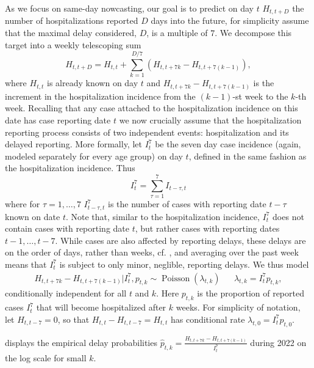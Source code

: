 As we focus on same-day nowcasting, our goal is to predict on day $t$ $H^{}_{t, t + D}$ the number of hospitalizations reported $D$ days into the future, for simplicity assume that the maximal delay considered, $D$, is a multiple of $7$. We decompose this target into a weekly telescoping sum 
$$
    H^{}_{t, t + D} = H^{}_{t, t} + \sum_{k = 1} ^{D / 7} (H^{}_{t, t + 7k} - H_{t, t + 7 ( k - 1)}),
$$
where $H_{t,t}$ is already known on day $t$ and $H_{t, t + 7k} - H_{t, t + 7 ( k - 1)}$ is the increment in the hospitalization incidence from the $(k-1)$-st week to the $k$-th week. Recalling that any case attached to the hospitalization incidence on this date has case reporting date $t$ we now crucially assume that the hospitalization reporting process consists of two independent events: hospitalization and its delayed reporting.
More formally, let $I^{7}_{t}$ be the seven day case incidence (again, modeled separately for every age group) on day $t$, defined in the same fashion as the hospitalization incidence. Thus 
$$
    I^{7}_t = \sum_{\tau = 1}^{7} I^{}_{t - \tau, t}
$$
where for $\tau = 1, \dots, 7$ $I^{7}_{t - \tau, t}$ is the number of cases with reporting date $t - \tau$ known on date $t$. Note that, similar to the hospitalization incidence, $I^{7}_t$ does not contain cases with reporting date $t$, but rather cases with reporting dates $t - 1, \dots, t - 7$. While cases are also affected by reporting delays, these delays are on the order of days, rather than weeks, cf. , and averaging over the past week means that $I^{7}_t$ is subject to only minor, neglible, reporting delays. We thus model 
\begin{align}
    \label{eq:hosp_increment_distribution}
    H_{t, t + 7k} - H^{}_{t, t + 7 ( k - 1)} | I^{7}_t, p^{}_{t,k} \sim \operatorname{Poisson} \left( \lambda^{}_{t,k} \right) && \lambda^{}_{t,k} = I^{7}_{t} p^{}_{t,k},
\end{align}
conditionally independent for all $t$ and $k$.
Here $p^{}_{t,k}$ is the proportion of reported cases $I^{7}_{t}$ that will become hospitalized after $k$ weeks.
For simplicity of notation, let $H_{t, t - 7} = 0$, so that $H_{t,t} - H_{t, t- 7} = H_{t,t}$ has conditional rate $\lambda_{t,0} = I^{7}_t p_{t,0}$.

 displays the empirical delay probabilities $\hat p_{t,k} = \frac{H_{t, t + 7k} - H_{t,t + 7 (k - 1)}}{I^{7}_t}$ during 2022 on the log scale for small $k$. 


